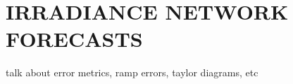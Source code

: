 \chapter{IRRADIANCE NETWORK FORECASTS}
\label{chap:network}

talk about error metrics, ramp errors, taylor diagrams, etc

